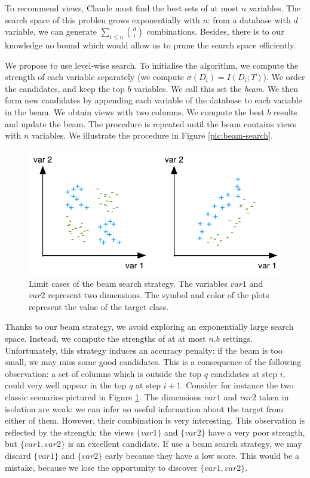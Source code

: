 To recommend views, Claude must find the best sets of at most $n$ variables.
The search space of this problen grows exponentially with $n$: from a database
with $d$ variable, we can generate $\sum_{i \leq n} \binom{d}{i}$ combinations.
Besides, there is to our knowledge no bound which would allow us to prune the
search space efficiently. 

We propose to use level-wise search. To initialise the algorithm, we compute
the strength of each variable separately (we compute $\sigma(D_i) = I(D_i;
T)$). We order the candidates, and keep the top $b$ variables. We call this set
the \emph{beam}. We then form new candidates by appending each variable of the
database to each variable in the beam. We obtain views with two columns. We
compute the best $b$ results and update the beam. The procedure is repeated
until the beam contains views with $n$ variables. We illustrate the procedure
in Figure \ref{pic:beam-search}.

\begin{figure}[t!]
\centering
\includegraphics[width=0.8\columnwidth]{images/strength-jump}
\caption{Limit cases of the beam search strategy. The variables $var1$ and
$var2$ represent two dimensions. The symbol and color of the plots represent
the value of the target class. }
\label{pic:strength-jump}
\end{figure}
Thanks to our beam strategy, we avoid exploring an exponentially large search
space. Instead, we compute the strengths of at at most $n.b$ settings.
Unfortunately, this strategy induces an accuracy penalty: if the beam is too
small, we may miss some good candidates. This is a consequence of the following
observation: a set of columns which is outside the top $q$ candidates at step
$i$, could very well appear in the top $q$ at step $i+1$. Consider for instance
the two classic scenarios pictured in Figure \ref{pic:strength-jump}. The
dimensions $var1$ and $var2$ taken in isolation are weak: we can infer no
useful information about the target from either of them. However, their
combination is very interesting.  This observation is reflected by the
strength: the views $\{var1\}$ and $\{var2\}$ have a very poor strength, but
$\{var1, var2\}$ is an excellent candidate. If use a beam search strategy, we
may discard  $\{var1\}$ and $\{var2\}$ early because they have a low score.
This would be a mistake, because we lose the opportunity to discover $\{var1,
var2\}$.

